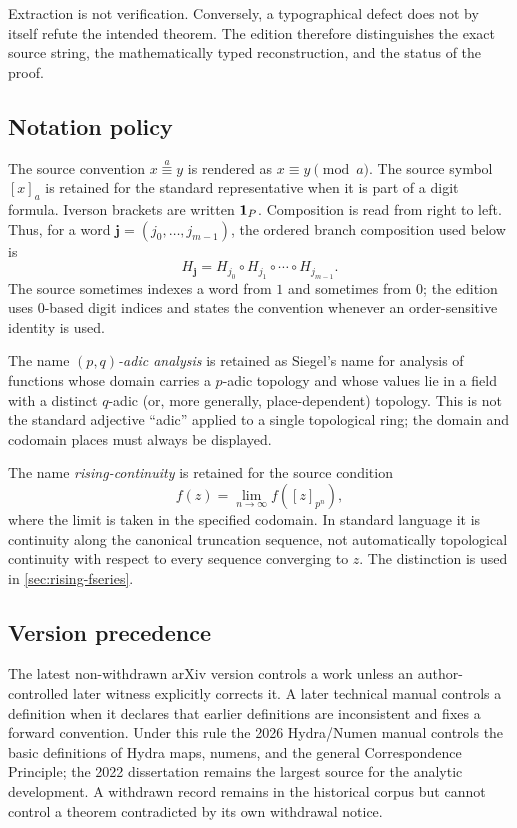 Extraction is not verification.  Conversely, a typographical defect does not
by itself refute the intended theorem.  The edition therefore distinguishes
the exact source string, the mathematically typed reconstruction, and the
status of the proof.

\subsection{Notation policy}

The source convention $x\overset{a}{\equiv}y$ is rendered as
$x\equiv y\pmod a$.  The source symbol $[x]_a$ is retained for the standard
representative when it is part of a digit formula.  Iverson brackets are
written $\mathbf 1_{P}$.  Composition is read from right to left.  Thus, for a word
$\mathbf j=(j_0,\ldots,j_{m-1})$, the ordered branch composition used below
is
\[
 H_{\mathbf j}=H_{j_0}\circ H_{j_1}\circ\cdots\circ H_{j_{m-1}}.
\]
The source sometimes indexes a word from $1$ and sometimes from $0$; the
edition uses $0$-based digit indices and states the convention whenever an
order-sensitive identity is used.

The name \emph{$(p,q)$-adic analysis} is retained as Siegel's name for
analysis of functions whose domain carries a $p$-adic topology and whose
values lie in a field with a distinct $q$-adic (or, more generally,
place-dependent) topology.  This is not the standard adjective ``adic''
applied to a single topological ring; the domain and codomain places must
always be displayed.

The name \emph{rising-continuity} is retained for the source condition
\[
 f(z)=\lim_{n\to\infty} f([z]_{p^n}),
\]
where the limit is taken in the specified codomain.  In standard language it
is continuity along the canonical truncation sequence, not automatically
topological continuity with respect to every sequence converging to $z$.
The distinction is used in \cref{sec:rising-fseries}.

\subsection{Version precedence}

The latest non-withdrawn arXiv version controls a work unless an
author-controlled later witness explicitly corrects it.  A later technical
manual controls a definition when it declares that earlier definitions are
inconsistent and fixes a forward convention.  Under this rule the 2026
Hydra/Numen manual controls the basic definitions of Hydra maps, numens, and
the general Correspondence Principle; the 2022 dissertation remains the
largest source for the analytic development.  A withdrawn record remains in
the historical corpus but cannot control a theorem contradicted by its own
withdrawal notice.

